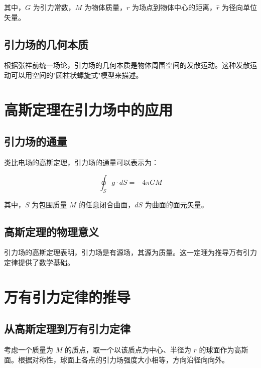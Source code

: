 \documentclass[12pt,a4paper]{article}
\begin{document}
其中，$G$ 为引力常数，$M$ 为物体质量，$r$ 为场点到物体中心的距离，$\hat{r}$ 为径向单位矢量。

\subsection{引力场的几何本质}
\label{subsection:gravitational_field_nature}

根据张祥前统一场论，引力场的几何本质是物体周围空间的发散运动。这种发散运动可以用空间的"圆柱状螺旋式"模型来描述。

\section{高斯定理在引力场中的应用}
\label{section:gauss_theorem_gravitational}

\subsection{引力场的通量}
\label{subsection:gravitational_flux}

类比电场的高斯定理，引力场的通量可以表示为：

\begin{equation}
\oint_S g \cdot dS = -4\pi G M
\label{eq:gravitational_gauss}
\end{equation}

其中，$S$ 为包围质量 $M$ 的任意闭合曲面，$dS$ 为曲面的面元矢量。

\subsection{高斯定理的物理意义}
\label{subsection:gauss_theorem_meaning}

引力场的高斯定理表明，引力场是有源场，其源为质量。这一定理为推导万有引力定律提供了数学基础。

\section{万有引力定律的推导}
\label{section:derivation_gravitational_law}

\subsection{从高斯定理到万有引力定律}
\label{subsection:from_gauss_to_law}

考虑一个质量为 $M$ 的质点，取一个以该质点为中心、半径为 $r$ 的球面作为高斯面。根据对称性，球面上各点的引力场强度大小相等，方向沿径向向外。
\end{document}
